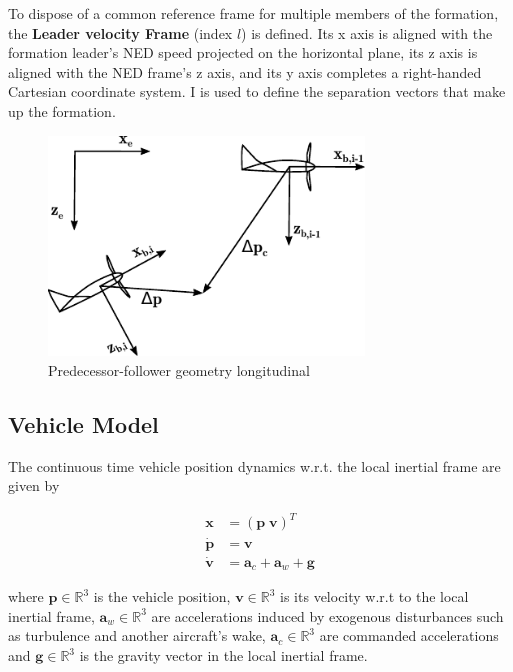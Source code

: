 \documentclass{ifacconf}
\providecommand{\mbf}[1]{\mathbf{#1}}
\begin{document}
To dispose of a common reference frame for multiple members of the formation, the \textbf{Leader velocity Frame} (index $l$) is defined. Its x axis is aligned with the formation leader's NED speed projected on the horizontal plane, its z axis is aligned with the NED frame's z axis, and its y axis completes a right-handed Cartesian coordinate system. I is used to define the separation vectors that make up the formation.

\begin{figure}
\begin{center}
\includegraphics[width=8.4cm]{frames.pdf}    %
\caption{Predecessor-follower geometry longitudinal}
\label{fig:frames}
\end{center}
\end{figure}

\subsection{Vehicle Model}

The continuous time vehicle position dynamics w.r.t. the local inertial frame are given by

\begin{align}
\mathbf{x} &= (\mbf{p} \; \mbf{v})^T \\
\dot{\mathbf{p}} &= \mbf{v}\\
\dot{\mbf{v}} &= \mbf{a}_{c} + \mbf{a}_w + \mbf{g}
\end{align}

where $\mbf{p} \in \mathbb{R}^3$ is the vehicle position, $\mbf{v} \in \mathbb{R}^3$ is its velocity w.r.t to the local inertial frame, $\mbf{a}_w \in \mathbb{R}^3$ are accelerations induced by exogenous disturbances such as turbulence and another aircraft's wake, $\mbf{a}_{c} \in \mathbb{R}^3$ are commanded accelerations and $\mbf{g} \in \mathbb{R}^3$ is the gravity vector in the local inertial frame.
\end{document}

